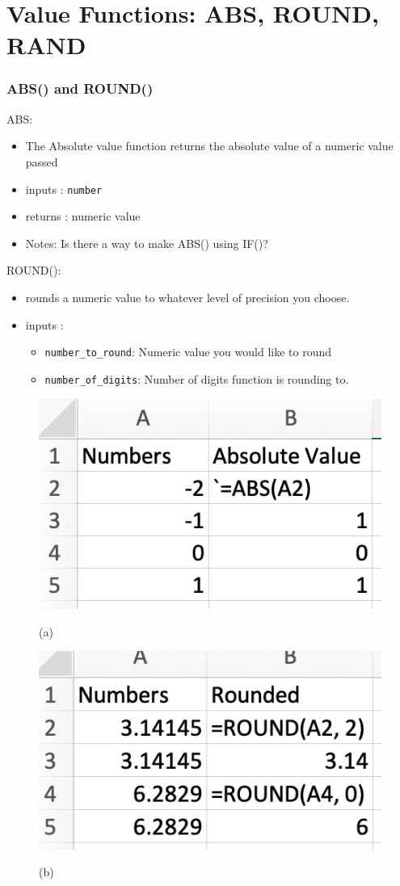 \documentclass[12pt]{beamer}
\begin{document}
\section{Value Functions: ABS, ROUND, RAND}
\begin{frame}
	\frametitle{ABS() and ROUND()}
	ABS: 
		\begin{itemize}
			\item The Absolute value function returns the absolute value of a numeric value passed
			\item inputs : \texttt{number} 
			\item returns : numeric value 
			\item Notes: Is there a way to make ABS() using IF()?
		\end{itemize}
	ROUND():
			\begin{itemize}
				\item rounds a numeric value to whatever level of precision you choose.
				\item inputs :
				\begin{itemize}
					\item \texttt{number\_to\_round}: Numeric value you would like to round
					\item \texttt{number\_of\_digits}: Number of digits function is rounding to.  
				\end{itemize}
			\end{itemize}
	
	\begin{figure}[htb]
		\begin{minipage}[t]{0.5\linewidth}\centering
			\includegraphics[width=0.5\linewidth]{ABS.png}
			\medskip
			\centerline{(a)}
		\end{minipage}\hfill
		\begin{minipage}[t]{0.5\linewidth}\centering
			\includegraphics[width=0.5\linewidth]{ROUND.png}
			\medskip
			\centerline{(b)}
		\end{minipage}
	\end{figure}
\end{frame}
\end{document}

